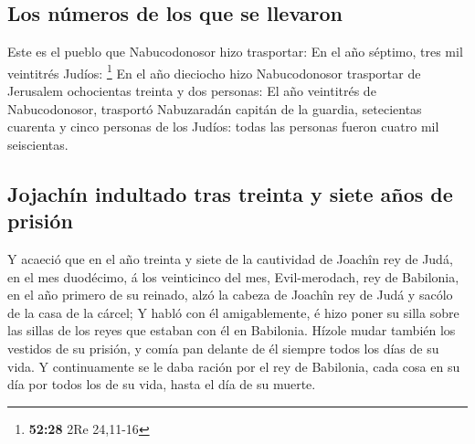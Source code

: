 \hypertarget{los-nuxfameros-de-los-que-se-llevaron}{%
\subsection{Los números de los que se
llevaron}\label{los-nuxfameros-de-los-que-se-llevaron}}

 Este es el pueblo que Nabucodonosor hizo trasportar: En
el año séptimo, tres mil veintitrés Judíos: \footnote{\textbf{52:28} 2Re
  24,11-16}  En el año dieciocho hizo Nabucodonosor
trasportar de Jerusalem ochocientas treinta y dos personas:
 El año veintitrés de Nabucodonosor, trasportó
Nabuzaradán capitán de la guardia, setecientas cuarenta y cinco personas
de los Judíos: todas las personas fueron cuatro mil seiscientas.

\hypertarget{jojachuxedn-indultado-tras-treinta-y-siete-auxf1os-de-prisiuxf3n}{%
\subsection{Jojachín indultado tras treinta y siete años de
prisión}\label{jojachuxedn-indultado-tras-treinta-y-siete-auxf1os-de-prisiuxf3n}}

 Y acaeció que en el año treinta y siete de la cautividad
de Joachîn rey de Judá, en el mes duodécimo, á los veinticinco del mes,
Evil-merodach, rey de Babilonia, en el año primero de su reinado, alzó
la cabeza de Joachîn rey de Judá y sacólo de la casa de la cárcel;
 Y habló con él amigablemente, é hizo poner su silla
sobre las sillas de los reyes que estaban con él en Babilonia.
 Hízole mudar también los vestidos de su prisión, y comía
pan delante de él siempre todos los días de su vida.  Y
continuamente se le daba ración por el rey de Babilonia, cada cosa en su
día por todos los de su vida, hasta el día de su muerte.
